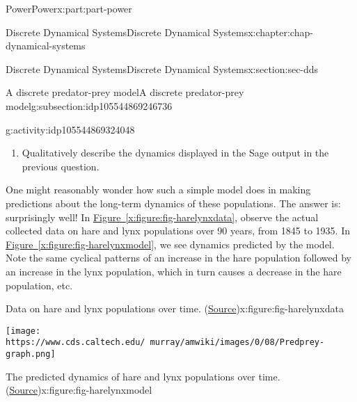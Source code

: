 \documentclass[oneside,10pt,]{book}
\newcommand{\xreffont}{\relax}
\numberwithin{equation}{section}
\begin{document}
\begin{partptx}{Power}{}{Power}{}{}{x:part:part-power}
\begin{chapterptx}{Discrete Dynamical Systems}{}{Discrete Dynamical Systems}{}{}{x:chapter:chap-dynamical-systems}
\begin{sectionptx}{Discrete Dynamical Systems}{}{Discrete Dynamical Systems}{}{}{x:section:sec-dds}
\begin{subsectionptx}{A discrete predator-prey model}{}{A discrete predator-prey model}{}{}{g:subsection:idp105544869246736}
\begin{activity}{}{g:activity:idp105544869324048}
\begin{enumerate}
\begin{sageinput}
def L(n):
	if n==0:
		return L_0
	else:
		return L(n-1) + (c*L(n-1)*H(n-1)-d*L(n-1))/nperiod
time=10
nn=range(time)
HH = [H(n) for n in nn]
LL = [L(n) for n in nn]
nH = list(zip(nn, HH))
nL = list(zip(nn, LL))
H_dots = points(nH, color='blue')
L_dots = points(nL, color='red')
p = H_dots + L_dots
p
\end{sageinput}
%
\item{}Qualitatively describe the dynamics displayed in the Sage output in the previous question.%
\end{enumerate}
\end{activity}%
%
%
One might reasonably wonder how such a simple model does in making predictions about the long-term dynamics of these populations. The answer is: surprisingly well! In \hyperref[x:figure:fig-harelynxdata]{Figure~{\xreffont\ref{x:figure:fig-harelynxdata}}}, observe the actual collected data on hare and lynx populations over 90 years, from 1845 to 1935. In \hyperref[x:figure:fig-harelynxmodel]{Figure~{\xreffont\ref{x:figure:fig-harelynxmodel}}}, we see dynamics predicted by the model. Note the same cyclical patterns of an increase in the hare population followed by an increase in the lynx population, which in turn causes a decrease in the hare population, etc.%
\begin{figureptx}{Data on hare and lynx populations over time. (\href{https://www.cds.caltech.edu/\~murray/amwiki/index.php/Predator_prey}{Source}\protect\footnotemark{})}{x:figure:fig-harelynxdata}{}%
\begin{image}{0.25}{0.5}{0.25}%
\texttt{[image: https://www.cds.caltech.edu/~murray/amwiki/images/0/08/Predprey-graph.png]}
\end{image}%
\tcblower
\end{figureptx}%
%
\begin{figureptx}{The predicted dynamics of hare and lynx populations over time. (\href{https://www.cds.caltech.edu/\~murray/amwiki/index.php/Predator_prey}{Source}\protect\footnotemark{})}{x:figure:fig-harelynxmodel}{}%
\begin{image}{0.25}{0.5}{0.25}%

\end{image}
\end{figureptx}
\end{subsectionptx}
\end{sectionptx}
\end{chapterptx}
\end{partptx}
\end{document}
